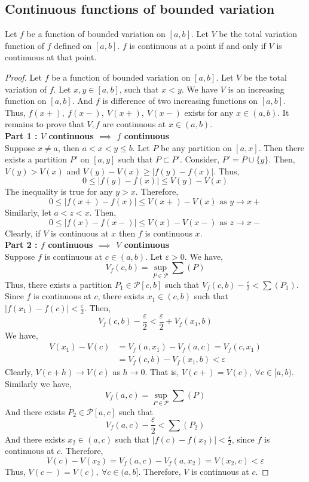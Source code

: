 \subsection{Continuous functions of bounded variation}
\begin{theorem}
	Let $f$ be a function of bounded variation on $[a,b]$. %
	Let $V$ be the total variation function of $f$ defined on $[a,b]$.
	$f$ is continuous at a point if and only if $V$ is continuous at that point.
\end{theorem}
\begin{proof}
	Let $f$ be a function of bounded variation on $[a,b]$.
	Let $V$ be the total variation of $f$.
	Let $x,y \in [a,b]$, such that $x<y$.
	We have $V$ is an increasing function on $[a,b]$.
	And $f$ is difference of two increasing functions on $[a,b]$.
	Thus, $f(x+),\ f(x-),\ V(x+),\ V(x-)$ exists for any $x \in (a,b)$.
	It remains to prove that $V,f$ are continuous at $x \in (a,b)$.\\

	\textbf{Part 1 : $V$ continuous $\implies$ $f$ continuous}\\
	Suppose $x \ne a$, then $a<x<y\le b$.
	Let $P$ be any partition on $[a,x]$.
	Then there exists a partition $P'$ on $[a,y]$ such that $P \subset P'$.
	Consider, $P' = P\cup\{y\}$.
	Then, $V(y) > V(x)$ and $V(y)-V(x) \ge |f(y)-f(x)|$.
	Thus,
	\[ 0 \le |f(y)-f(x)| \le V(y)-V(x) \]
	The inequality is true for any $y>x$.
	Therefore,
	\[ 0 \le |f(x+)-f(x)| \le V(x+)-V(x) \text{ as } y \to x+ \]
	Similarly, let $a<z<x$.
	Then,
	\[ 0 \le |f(x)-f(x-)| \le V(x)-V(x-) \text{ as } z \to x- \]
	Clearly, if $V$ is continuous at $x$ then $f$ is continuous $x$.\\

	\textbf{Part 2 : $f$ continuous $\implies$ $V$ continuous}\\
	Suppose $f$ is continuous at $c \in (a,b)$.
	Let $\varepsilon > 0$.
	We have,
	\[ V_f(c,b) = \sup_{P \in \mathscr{P}} \sum (P) \]
	Thus, there exists a partition $P_1 \in \mathscr{P}[c,b]$ such that $V_f(c,b) - \frac{\varepsilon}{2} < \sum (P_1)$.
	Since $f$ is continuous at $c$, there exists $x_1 \in (c,b)$ such that $|f(x_1)-f(c)| < \frac{\varepsilon}{2}$.
	Then,
	\[ V_f(c,b) - \frac{\varepsilon}{2} < \frac{\varepsilon}{2} + V_f(x_1,b) \]
	We have,
	\begin{align*}
	V(x_1)-V(c) 
		& = V_f(a,x_1) - V_f(a,c) = V_f(c,x_1) \\
		& = V_f(c,b) - V_f(x_1,b) < \varepsilon
	\end{align*}
	Clearly, $V(c+h) \to V(c)$ as $h \to 0$.
	That is, $V(c+) = V(c),\ \forall c \in [a,b)$.
	Similarly we have,
	\[ V_f(a,c) = \sup_{P \in \mathscr{P}} \sum (P) \]
	And there exists $P_2 \in \mathscr{P}[a,c]$ such that
	\[ V_f(a,c) - \frac{\varepsilon}{2} < \sum (P_2) \]
	And there exists $x_2 \in (a,c)$ such that $|f(c)-f(x_2)| < \frac{\varepsilon}{2}$, since $f$ is continuous at $c$.
	Therefore,
	\[ V(c)-V(x_2) = V_f(a,c) - V_f(a,x_2) = V(x_2,c) < \varepsilon \]
	Thus, $V(c-) = V(c),\ \forall c \in (a,b]$.
	Therefore, $V$ is continuous at $c$.
\end{proof}
